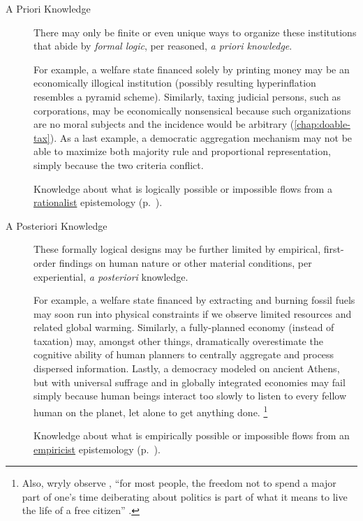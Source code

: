 \begin{description}
	\item[A Priori Knowledge]
		\label{itm:a-priori}
	There may only be finite or even unique ways to organize these institutions that abide by \emph{formal logic}, per reasoned, \emph{a priori knowledge}.

	For example, a welfare state financed solely by printing money may be an economically illogical institution (possibly resulting hyperinflation resembles a pyramid scheme).
	Similarly, taxing judicial persons, such as corporations, may be economically nonsensical because such organizations are no moral subjects and the incidence would be arbitrary (\autoref{chap:doable-tax}).
	As a last example, a democratic aggregation mechanism may not be able to maximize both majority rule and proportional representation, simply because the two criteria conflict.

	Knowledge about what is logically possible or impossible flows from a \hyperref[itm:rationalism]{rationalist} epistemology (p.~\pageref{itm:rationalism}).

	\item[A Posteriori Knowledge]
		\label{itm:a-posteriori}
	These formally logical designs may be further limited by empirical, first-order findings on human nature or other material conditions, per experiential, \emph{a posteriori} knowledge.

	For example, a welfare state financed by extracting and burning fossil fuels may soon run into physical constraints if we observe limited resources and related global warming.
	Similarly, a fully-planned economy (instead of taxation) may, amongst other things, dramatically overestimate the cognitive ability of human planners to centrally aggregate and process dispersed information.
	Lastly, a democracy modeled on ancient Athens, but with universal suffrage and in globally integrated economies may fail simply because human beings interact too slowly to listen to every fellow human on the planet, let alone to get anything done.
	\footnote{
		Also, wryly observe \citeauthor{GutmannThompson-2004-aa}, ``for most people, the freedom not to spend a major part of one's time deiberating about politics is part of what it means to live the life of a free citizen'' \citeyearpar[30]{GutmannThompson-2004-aa}.
	}

	Knowledge about what is empirically possible or impossible flows from an \hyperref[itm:empiricism]{empiricist} epistemology (p.~\pageref{itm:empiricism}).
\end{description}

